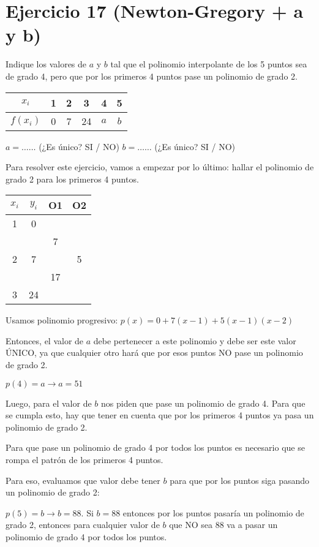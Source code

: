 \documentclass[11pt]{article}
\begin{document}
		\section{Ejercicio 17 (Newton-Gregory + a y b)}
	Indique los valores de $a$ y $b$ tal que el polinomio interpolante de los 5 puntos sea de grado 4, pero que por los primeros 4 puntos pase un polinomio de grado 2.
	
	\begin{tabular}{|c|c|c|c|c|c|}
		\hline
		$x_i$ & 1 & 2 & 3& 4&5\\
		\hline
		$f(x_i)$ & 0 & 7 & 24 & $a$ & $b$\\
		\hline
	\end{tabular}

	$a=\dots\dots$ (¿Es único? SI / NO) \hspace{2cm} $b=\dots\dots$ (¿Es único? SI / NO)
	
	Para resolver este ejercicio, vamos a empezar por lo último: hallar el polinomio de grado 2 para los primeros 4 puntos.
	
	\begin{tabular}{|c c c c|}
		\hline
		$x_i$ & $y_i$ & O1 & O2\\
		\hline
		1 & 0 & & \\
		& & 7 & \\
		2  & 7  & &5 \\
		& & 17 & \\
		3  & 24 & & \\
		\hline
	\end{tabular}

	Usamos polinomio progresivo: $p(x)=0+7(x-1)+5(x-1)(x-2)$
	
	Entonces, el valor de $a$ debe pertenecer a este polinomio y debe ser este valor ÚNICO, ya que cualquier otro hará que por esos puntos NO pase un polinomio de grado 2. 
	
	$p(4)=a \rightarrow a=51$
	
	Luego, para el valor de $b$ nos piden que pase un polinomio de grado 4. Para que se cumpla esto, hay que tener en cuenta que por los primeros 4 puntos ya pasa un polinomio de grado 2.
	
	Para que pase un polinomio de grado 4 por todos los puntos es necesario que se rompa el patrón de los primeros 4 puntos.
	
	Para eso, evaluamos que valor debe tener $b$ para que por los puntos siga pasando un polinomio de grado 2:
	
	$p(5)=b \rightarrow b=88$. Si $b=88$ entonces por los puntos pasaría un polinomio de grado 2, entonces para cualquier valor de $b$ que NO sea 88 va a pasar un polinomio de grado 4 por todos los puntos.
	
\end{document}
